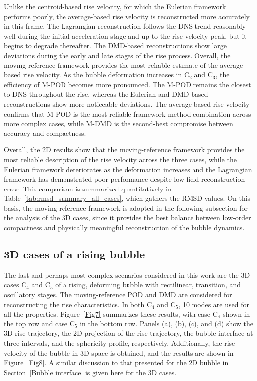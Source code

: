 \documentclass[a4paper,fleqn]{cas-sc}
\begin{document}
	Unlike the centroid-based rise velocity, for which the Eulerian framework performs poorly, the average-based rise velocity is reconstructed more accurately in this frame. The Lagrangian reconstruction follows the DNS trend reasonably well during the initial acceleration stage and up to the rise-velocity peak, but it begins to degrade thereafter. The DMD-based reconstructions show large deviations during the early and late stages of the rise process. Overall, the moving-reference framework provides the most reliable estimate of the average-based rise velocity. As the bubble deformation increases in C$_2$ and C$_3$, the efficiency of M-POD becomes more pronounced. The M-POD remains the closest to DNS throughout the rise, whereas the Eulerian and DMD-based reconstructions show more noticeable deviations. The average-based rise velocity confirms that M-POD is the most reliable framework-method combination across more complex cases, while M-DMD is the second-best compromise between accuracy and compactness.
	
	Overall, the 2D results show that the moving-reference framework provides the most reliable description of the rise velocity across the three cases, while the Eulerian framework deteriorates as the deformation increases and the Lagrangian framework has demonstrated poor performance despite low field reconstruction error. This comparison is summarized quantitatively in Table~\ref{tab:rmsd_summary_all_cases}, which gathers the RMSD values. On this basis, the moving-reference framework is adopted in the following subsection for the analysis of the 3D cases, since it provides the best balance between low-order compactness and physically meaningful reconstruction of the bubble dynamics.
	
	\subsection{3D cases of a rising bubble}
	
	The last and perhaps most complex scenarios considered in this work are the 3D cases C$_4$ and C$_5$ of a rising, deforming bubble with rectilinear, transition, and oscillatory stages. The moving-reference POD and DMD are considered for reconstructing the rise characteristics. In both C$_4$ and C$_5$, 10 modes are used for all the properties. Figure~\ref{Fig7} summarizes these results, with case C$_4$ shown in the top row and case C$_5$ in the bottom row. Panels (a), (b), (c), and (d) show the 3D rise trajectory, the 2D projection of the rise trajectory, the bubble interface at three intervals, and the sphericity profile, respectively. Additionally, the rise velocity of the bubble in 3D space is obtained, and the results are shown in Figure~\ref{Fig8}. A similar discussion to that presented for the 2D bubble in Section~\ref{Bubble interface} is given here for the 3D cases.
	
\end{document}
